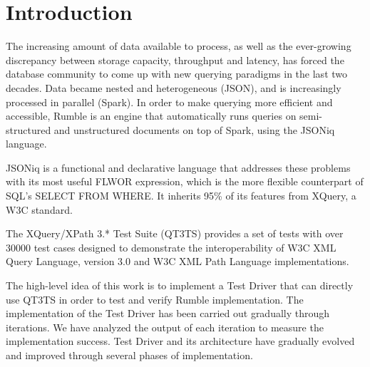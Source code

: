 
\chapter{Introduction}
\label{chapter:introduction}
The increasing amount of data available to process, as well as the ever-growing discrepancy between storage capacity, throughput and latency, has forced the database community to come up with new querying paradigms in the last two decades. Data became nested and heterogeneous (JSON), and is increasingly processed in parallel (Spark). In order to make querying more efficient and accessible, Rumble \cite{RumblePaper} is an engine that automatically runs queries on semi-structured and unstructured documents on top of Spark, using the JSONiq language. 

JSONiq \cite{JSONIQORG} is a functional and declarative language that addresses these problems with its most useful FLWOR expression, which is the more flexible counterpart of SQL’s SELECT FROM WHERE. It inherits 95\% of its features from XQuery, a W3C standard.

The XQuery/XPath 3.* Test Suite (QT3TS) \cite{TestSuite} provides a set of tests with over 30000 test cases designed to demonstrate the interoperability of W3C XML Query Language, version 3.0 and W3C XML Path Language implementations.

The high-level idea of this work is to implement a Test Driver that can directly use QT3TS in order to test and verify Rumble implementation. The implementation of the Test Driver has been carried out gradually through iterations. We have analyzed the output of each iteration to measure the implementation success. Test Driver and its architecture have gradually evolved and improved through several phases of implementation. 